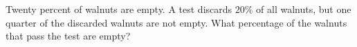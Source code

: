Twenty percent of walnuts are empty. A test discards $20\%$ of all walnuts, but one quarter of the discarded walnuts are not empty. What percentage of the walnuts that pass the test are empty?
